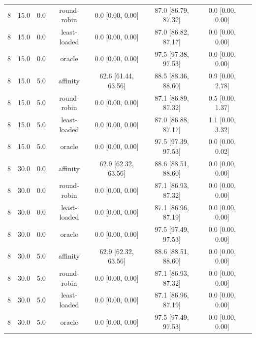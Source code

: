 \begin{table}[t]
\begin{tabular}{lccccccc}
8 & 15.0 & 0.0 & round-robin & 0.0 \tiny [0.00, 0.00] & 87.0 \tiny [86.79, 87.32] & 0.0 \tiny [0.00, 0.00] \\
8 & 15.0 & 0.0 & least-loaded & 0.0 \tiny [0.00, 0.00] & 87.0 \tiny [86.82, 87.17] & 0.0 \tiny [0.00, 0.00] \\
8 & 15.0 & 0.0 & oracle & 0.0 \tiny [0.00, 0.00] & 97.5 \tiny [97.38, 97.53] & 0.0 \tiny [0.00, 0.00] \\
8 & 15.0 & 5.0 & affinity & 62.6 \tiny [61.44, 63.56] & 88.5 \tiny [88.36, 88.60] & 0.9 \tiny [0.00, 2.78] \\
8 & 15.0 & 5.0 & round-robin & 0.0 \tiny [0.00, 0.00] & 87.1 \tiny [86.89, 87.32] & 0.5 \tiny [0.00, 1.37] \\
8 & 15.0 & 5.0 & least-loaded & 0.0 \tiny [0.00, 0.00] & 87.0 \tiny [86.88, 87.17] & 1.1 \tiny [0.00, 3.32] \\
8 & 15.0 & 5.0 & oracle & 0.0 \tiny [0.00, 0.00] & 97.5 \tiny [97.39, 97.53] & 0.0 \tiny [0.00, 0.02] \\
8 & 30.0 & 0.0 & affinity & 62.9 \tiny [62.32, 63.56] & 88.6 \tiny [88.51, 88.60] & 0.0 \tiny [0.00, 0.00] \\
8 & 30.0 & 0.0 & round-robin & 0.0 \tiny [0.00, 0.00] & 87.1 \tiny [86.93, 87.32] & 0.0 \tiny [0.00, 0.00] \\
8 & 30.0 & 0.0 & least-loaded & 0.0 \tiny [0.00, 0.00] & 87.1 \tiny [86.96, 87.19] & 0.0 \tiny [0.00, 0.00] \\
8 & 30.0 & 0.0 & oracle & 0.0 \tiny [0.00, 0.00] & 97.5 \tiny [97.49, 97.53] & 0.0 \tiny [0.00, 0.00] \\
8 & 30.0 & 5.0 & affinity & 62.9 \tiny [62.32, 63.56] & 88.6 \tiny [88.51, 88.60] & 0.0 \tiny [0.00, 0.00] \\
8 & 30.0 & 5.0 & round-robin & 0.0 \tiny [0.00, 0.00] & 87.1 \tiny [86.93, 87.32] & 0.0 \tiny [0.00, 0.00] \\
8 & 30.0 & 5.0 & least-loaded & 0.0 \tiny [0.00, 0.00] & 87.1 \tiny [86.96, 87.19] & 0.0 \tiny [0.00, 0.00] \\
8 & 30.0 & 5.0 & oracle & 0.0 \tiny [0.00, 0.00] & 97.5 \tiny [97.49, 97.53] & 0.0 \tiny [0.00, 0.00] \\
\bottomrule
\end{tabular}
\end{table}
